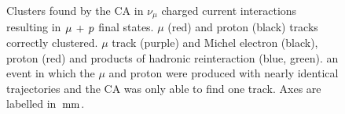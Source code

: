 \begin{figure}
    \centering
    \caption[Clusters found by the CA in $\ccqe$ events]{\label{fig:ca-clusters-ccqe}Clusters found by the CA in $\nu_\mu$ charged current interactions resulting in $\ccqe$ final states.  $\mu$ (red) and proton (black) tracks correctly clustered.  $\mu$ track (purple) and Michel electron (black), proton (red) and products of hadronic reinteraction (blue, green).  an event in which the $\mu$ and proton were produced with nearly identical trajectories and the CA was only able to find one track. Axes are labelled in $\,\mathrm{mm}$.}
\end{figure}

